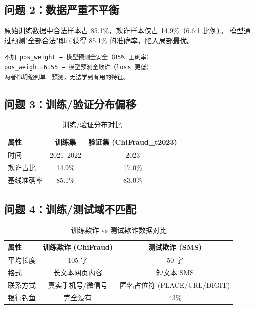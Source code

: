 \documentclass[11pt,a4paper]{article}
\begin{document}
\subsection{问题 2：数据严重不平衡}

原始训练数据中合法样本占 85.1\%，欺诈样本仅占 14.9\%（6.6:1 比例）。
模型通过预测"全部合法"即可获得 85.1\% 的准确率，陷入局部最优。

\begin{Verbatim}[frame=single,fontsize=\small,label=不同 pos\_weight 下的坍缩方向]
不加 pos_weight → 模型预测全安全（85% 正确率）
pos_weight=6.55 → 模型预测全欺诈（loss 更低）
两者都坍缩到单一预测，无法学到有用的特征。
\end{Verbatim}

\subsection{问题 3：训练/验证分布偏移}

\begin{table}[H]
\centering
\caption{训练/验证分布对比}
\begin{tabular}{lcc}
\toprule
属性 & 训练集 & 验证集 (ChiFraud\_t2023) \\
\midrule
时间 & 2021--2022 & 2023 \\
欺诈占比 & 14.9\% & 17.0\% \\
基线准确率 & 85.1\% & 83.0\% \\
\bottomrule
\end{tabular}
\end{table}

\subsection{问题 4：训练/测试域不匹配}

\begin{table}[H]
\centering
\caption{训练欺诈 vs 测试欺诈数据对比}
\begin{tabular}{lcc}
\toprule
属性 & 训练欺诈 (ChiFraud) & 测试欺诈 (SMS) \\
\midrule
平均长度 & 105 字 & 50 字 \\
格式 & 长文本网页内容 & 短文本 SMS \\
联系方式 & 真实手机号/微信号 & 匿名占位符 (PLACE/URL/DIGIT) \\
银行钓鱼 & 完全没有 & 43\% \\
\bottomrule
\end{tabular}
\end{table}
\end{document}
